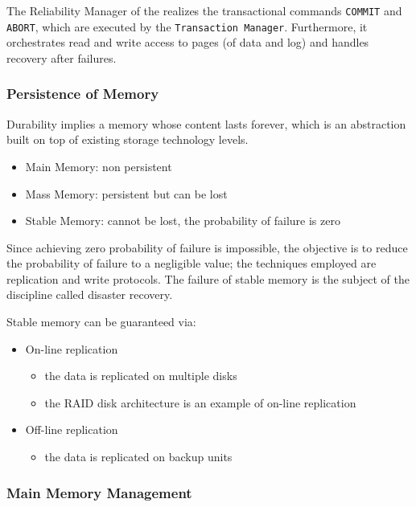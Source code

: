 \documentclass[english]{article}
\begin{document}
The Reliability Manager of the \dbms realizes the transactional commands \texttt{COMMIT} and \texttt{ABORT}, which are executed by the \texttt{Transaction Manager}.
Furthermore, it orchestrates read and write access to pages (of data and log) and handles recovery after failures.

\subsubsection{Persistence of Memory}

Durability implies a memory whose content lasts forever, which is an abstraction built on top of existing storage technology levels.

\begin{itemize}
  \item Main Memory: non persistent
  \item Mass Memory: persistent but can be lost
  \item Stable Memory: cannot be lost, the probability of failure is zero
\end{itemize}

Since achieving zero probability of failure is impossible, the objective is to reduce the probability of failure to a negligible value;
the techniques employed are replication and write protocols.
The failure of stable memory is the subject of the discipline called disaster recovery.

\bigskip
Stable memory can be guaranteed via:

\begin{itemize}
  \item On-line replication
        \begin{itemize}
          \item the data is replicated on multiple disks
          \item the RAID disk architecture is an example of on-line replication
        \end{itemize}
  \item Off-line replication
        \begin{itemize}
          \item the data is replicated on backup units
        \end{itemize}
\end{itemize}

\subsubsection{Main Memory Management}
\end{document}
